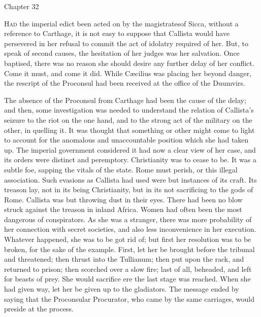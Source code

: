 Chapter 32


H\textsc{ad} the imperial edict been acted on by the magistrates\emph{}of
Sicca, without a reference to Carthage, it is not easy to suppose that
Callista would have persevered in her refusal to commit the act of
idolatry required of her. But, to speak of second causes, the
hesitation of her judges was her salvation. Once baptised, there was
no reason she should desire any further delay of her conflict. Come it
must, and come it did. While Cæcilius was placing her beyond danger,
the rescript of the Proconsul had been received at the office of the
Duumvirs.

The absence of the Proconsul from Carthage had been the cause of
the delay; and then, some investigation was needed to understand the
relation of Callista's seizure to the riot on the one hand, and to the
strong act of the military on the other, in quelling it. It was
thought that something or other might come to light to account for the
anomalous and unaccountable position which she had taken up. The
imperial government considered it had now a clear view of her case,
and its orders were distinct and peremptory. Christianity was to cease
to be. It was a subtle foe, sapping the vitals of the state.
Rome must perish, or this illegal association. Such evasions as
Callista had used were but instances of its craft. Its treason lay,
not in its being Christianity, but in its not sacrificing to the gods
of Rome. Callista was but throwing dust in their eyes. There had been
no blow struck against the treason in inland Africa. Women had often
been the most dangerous of conspirators. As she was a stranger, there
was more probability of her connection with secret societies, and also
less inconvenience in her execution. Whatever happened, she was to be
got rid of; but first her resolution was to be broken, for the sake of
the example. First, let her be brought before the tribunal and
threatened; then thrust into the Tullianum; then put upon the rack,
and returned to prison; then scorched over a slow fire; last of all,
beheaded, and left for beasts of prey. She would sacrifice ere the
last stage was reached. When she had given way, let her be given up to
the gladiators. The message ended by saying that the Proconsular
Procurator, who came by the same carriages, would preside at the
process.

